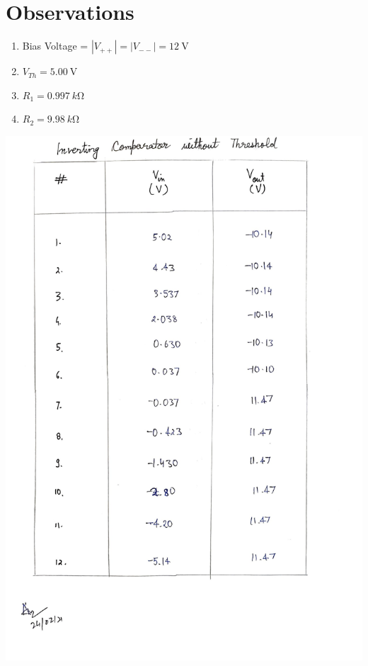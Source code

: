 \section{Observations}
\begin{enumerate}
    \item Bias Voltage = $|V_{++}| = |V_{--}| = \SI{12}{\volt}$
    \item $V_{Th} = \SI{5.00}{\volt}$
    \item $R_1 = \SI{0.997}{k\ohm}$
    \item $R_2 = \SI{9.98}{k\ohm}$
\end{enumerate}
\clearpage
\begin{center}
    \includegraphics[scale = 0.28]{OPAMP Apps/invcomp.jpg}
\end{center}
\clearpage
